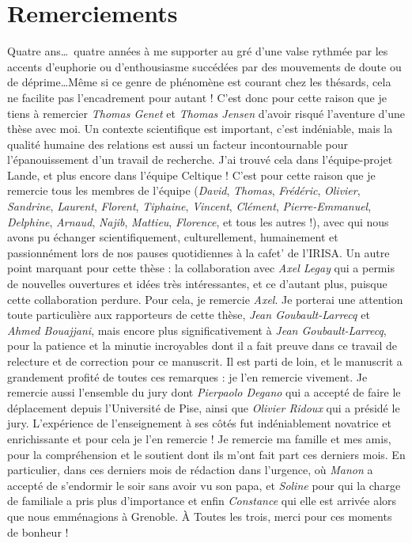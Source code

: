 \section*{Remerciements}

Quatre ans\dots\ quatre années à me supporter au gré d’une valse rythmée par les
accents d’euphorie ou d’enthousiasme succédées par des mouvements de
doute ou de déprime\dots Même si ce genre de phénomène est courant chez
les thésards, cela ne facilite pas l’encadrement pour autant ! C’est
donc pour cette raison que je tiens à remercier \textit{Thomas Genet} et \textit{Thomas
Jensen} d’avoir risqué l’aventure d’une thèse avec moi. Un contexte
scientifique est important, c’est indéniable, mais la qualité humaine
des relations est aussi un facteur incontournable pour
l’épanouissement d'un travail de recherche. J’ai trouvé cela dans
l’équipe-projet Lande, et plus encore dans l’équipe Celtique ! C’est
pour cette raison que je remercie tous les membres de l’équipe (\textit{David}, 
\textit{Thomas}, \textit{Frédéric}, \textit{Olivier}, \textit{Sandrine},
\textit{Laurent}, \textit{Florent}, \textit{Tiphaine}, \textit{Vincent},
\textit{Clément}, \textit{Pierre-Emmanuel}, \textit{Delphine}, \textit{Arnaud},
\textit{Najib}, \textit{Mattieu}, \textit{Florence}, et tous les autres !), 
avec qui nous avons pu échanger
scientifiquement, culturellement, humainement et passionnément lors de
nos pauses quotidiennes à la cafet’ de l’IRISA. Un autre point
marquant pour cette thèse : la collaboration avec \textit{Axel Legay} qui a
permis de nouvelles ouvertures et idées très intéressantes, et ce
d’autant plus, puisque cette collaboration perdure. Pour cela, je
remercie \textit{Axel}. Je porterai une attention toute particulière aux
rapporteurs de cette thèse, \textit{Jean Goubault-Larrecq} et \textit{Ahmed Bouajjani},
mais encore plus significativement à \textit{Jean Goubault-Larrecq}, pour la
patience et la minutie incroyables dont il a fait preuve dans ce
travail de relecture et de correction pour ce manuscrit. Il est parti
de loin, et le manuscrit a grandement profité de toutes ces remarques
: je l’en remercie vivement. Je remercie aussi l’ensemble du jury dont
\textit{Pierpaolo Degano} qui a accepté de faire le déplacement depuis
l’Université de Pise, ainsi que \textit{Olivier Ridoux} qui a présidé le
jury. L’expérience de l’enseignement à ses côtés fut indéniablement
novatrice et enrichissante et pour cela je l’en remercie ! Je remercie
ma famille et mes amis, pour la compréhension et le soutient dont ils
m’ont fait part ces derniers mois. En particulier, dans ces derniers
mois de rédaction dans l’urgence, où \textit{Manon} a accepté de s’endormir le
soir sans avoir vu son papa, et \textit{Soline} pour qui la charge de familiale
a pris plus d’importance et enfin \textit{Constance} qui elle est arrivée alors
que nous emménagions à Grenoble. À Toutes les trois, merci pour ces
moments de bonheur !



